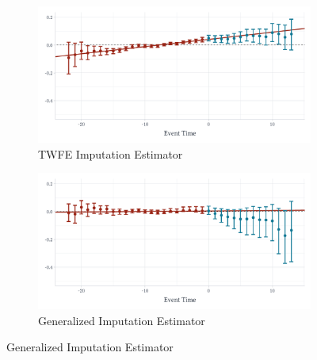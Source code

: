 \begin{figure}
\caption{Effect of Walmart on County $\log$ wholesale Employment}
\label{fig:walmart_wholesale}

\begin{center}
\begin{subfigure}[b]{0.75\textwidth}
  \caption{TWFE Imputation Estimator}
  \begin{adjustbox}{width=\textwidth, center}
    \includegraphics{figures/generalized/did2s_wholesale.pdf}
  \end{adjustbox}
\end{subfigure}
\end{center}
\begin{center}
\begin{subfigure}[b]{0.75\textwidth}
  \caption{Generalized Imputation Estimator}
  \begin{adjustbox}{width=\textwidth, center}
    \includegraphics{figures/generalized/qld_wholesale.pdf}
  \end{adjustbox}
\end{subfigure}
\end{center}


\end{figure}
